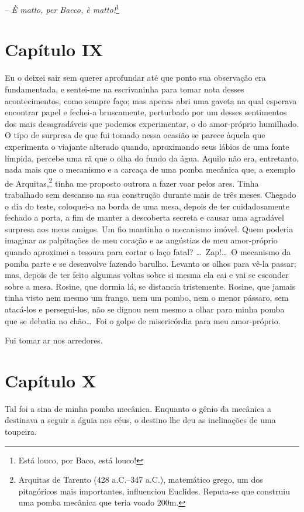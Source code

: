 -- \textit{È matto, per Bacco, è matto!}\footnote{ Está louco, por Baco, está
louco!}

\section{Capítulo IX}

 Eu o deixei sair sem querer aprofundar até que ponto sua observação era
fundamentada, e sentei-me na escrivaninha para tomar nota desses
acontecimentos, como sempre faço; mas apenas abri uma gaveta na qual
esperava encontrar papel e fechei-a bruscamente, perturbado por um
desses sentimentos dos mais desagradáveis que podemos experimentar, o
do amor-próprio humilhado. O tipo de surpresa de que fui tomado nessa
ocasião se parece àquela que experimenta o viajante alterado quando,
aproximando seus lábios de uma fonte límpida, percebe uma rã que o olha
do fundo da água. Aquilo não era, entretanto, nada mais que o mecanismo
e a carcaça de uma pomba mecânica que, a exemplo de Arquitas,\footnote{
Arquitas de Tarento (428 a.C.--347 a.C.), matemático grego, um dos
pitagóricos mais importantes, influenciou Euclides. Reputa-se que
construiu uma pomba mecânica que teria voado 200m.} tinha me
proposto outrora a fazer voar pelos ares. Tinha trabalhado sem descanso
na sua construção durante mais de três meses. Chegado o dia do teste,
coloquei-a na borda de uma mesa, depois de ter cuidadosamente fechado a
porta, a fim de manter a descoberta secreta e causar uma agradável
surpresa aos meus amigos. Um fio mantinha o mecanismo imóvel. Quem
poderia imaginar as palpitações de meu coração e as angústias de meu
amor-próprio quando aproximei a tesoura para cortar o laço fatal?
\ldots\ Zap!\ldots\ O mecanismo da pomba parte e se desenvolve fazendo barulho.
Levanto os olhos para vê-la passar; mas, depois de ter feito algumas
voltas sobre si mesma ela cai e vai se esconder sobre a mesa. Rosine,
que dormia lá, se distancia tristemente. Rosine, que jamais tinha visto
nem mesmo um frango, nem um pombo, nem o menor pássaro, sem atacá-los e
persegui-los, não se dignou nem mesmo a olhar para minha pomba que se
debatia no chão\ldots\ Foi o golpe de misericórdia para meu amor-próprio.

Fui tomar ar nos arredores.

\section{Capítulo X}

 Tal foi a sina de minha pomba mecânica. Enquanto o gênio da mecânica a
destinava a seguir a águia nos céus, o destino lhe deu as inclinações
de uma toupeira. 

